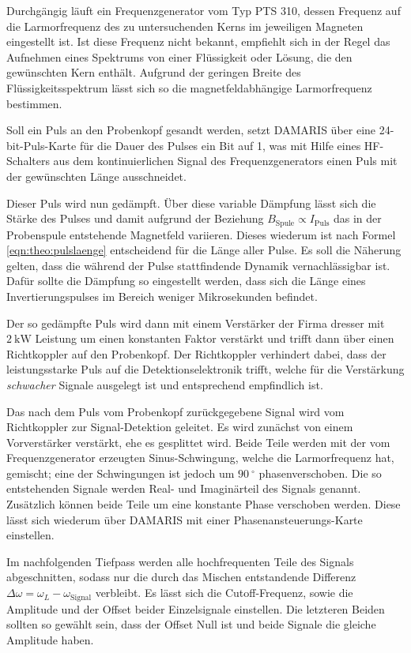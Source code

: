 Durchgängig läuft ein Frequenzgenerator vom Typ PTS 310, dessen Frequenz auf die Larmorfrequenz des zu untersuchenden Kerns im jeweiligen Magneten eingestellt ist. Ist diese Frequenz nicht bekannt, empfiehlt sich in der Regel das Aufnehmen eines Spektrums von einer Flüssigkeit oder Lösung, die den gewünschten Kern enthält. Aufgrund der geringen Breite des Flüssigkeitsspektrum lässt sich so die magnetfeldabhängige Larmorfrequenz bestimmen.

Soll ein Puls an den Probenkopf gesandt werden, setzt DAMARIS über eine 24-bit-Puls-Karte für die Dauer des Pulses ein Bit auf 1, was mit Hilfe eines HF-Schalters aus dem kontinuierlichen Signal des Frequenzgenerators einen Puls mit der gewünschten Länge ausschneidet.

Dieser Puls wird nun gedämpft. Über diese variable Dämpfung lässt sich die Stärke des Pulses und damit aufgrund der Beziehung $B_\text{Spule} \propto I_\text{Puls}$ das in der Probenspule entstehende Magnetfeld variieren. Dieses wiederum ist nach Formel \eqref{eqn:theo:pulslaenge} entscheidend für die Länge aller Pulse. Es soll die Näherung gelten, dass die während der Pulse stattfindende Dynamik vernachlässigbar ist. Dafür sollte die Dämpfung so eingestellt werden, dass sich die Länge eines Invertierungspulses im Bereich weniger Mikrosekunden befindet.

Der so gedämpfte Puls wird dann mit einem Verstärker der Firma dresser mit $\SI{2}{\kilo\watt}$ Leistung um einen konstanten Faktor verstärkt und trifft dann über einen Richtkoppler auf den Probenkopf. Der Richtkoppler verhindert dabei, dass der leistungsstarke Puls auf die Detektionselektronik trifft, welche für die Verstärkung \emph{schwacher} Signale ausgelegt ist und entsprechend empfindlich ist.

Das nach dem Puls vom Probenkopf zurückgegebene Signal wird vom Richtkoppler zur Signal-Detektion geleitet. Es wird zunächst von einem Vorverstärker verstärkt, ehe es gesplittet wird. Beide Teile werden mit der vom Frequenzgenerator erzeugten Sinus-Schwingung, welche die Larmorfrequenz hat, gemischt; eine der Schwingungen ist jedoch um $\SI{90}{^\circ}$ phasenverschoben. Die so entstehenden Signale werden Real- und Imaginärteil des Signals genannt. Zusätzlich können beide Teile um eine konstante Phase verschoben werden. Diese lässt sich wiederum über DAMARIS mit einer Phasenansteuerungs-Karte einstellen.

Im nachfolgenden Tiefpass werden alle hochfrequenten Teile des Signals abgeschnitten, sodass nur die durch das Mischen entstandende Differenz $\Delta \omega = \omega_L - \omega_\text{Signal}$ verbleibt. Es lässt sich die Cutoff-Frequenz, sowie die Amplitude und der Offset beider Einzelsignale einstellen. Die letzteren Beiden sollten so gewählt sein, dass der Offset Null ist und beide Signale die gleiche Amplitude haben.


